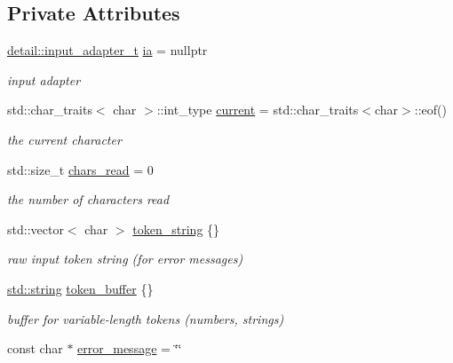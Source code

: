 \subsection*{Private Attributes}
\begin{DoxyCompactItemize}
\item 
\hyperlink{namespacenlohmann_1_1detail_ae132f8cd5bb24c5e9b40ad0eafedf1c2}{detail\+::input\+\_\+adapter\+\_\+t} \hyperlink{classnlohmann_1_1detail_1_1lexer_aa7e69cd9d51451fd798eaf501b40421f}{ia} = nullptr
\begin{DoxyCompactList}\small\item\em input adapter \end{DoxyCompactList}\item 
std\+::char\+\_\+traits$<$ char $>$\+::int\+\_\+type \hyperlink{classnlohmann_1_1detail_1_1lexer_a47169f9aaf0da4c9885e61d3109859aa}{current} = std\+::char\+\_\+traits$<$char$>$\+::eof()
\begin{DoxyCompactList}\small\item\em the current character \end{DoxyCompactList}\item 
std\+::size\+\_\+t \hyperlink{classnlohmann_1_1detail_1_1lexer_aab991bcbf230c372b276742f1790ba5b}{chars\+\_\+read} = 0
\begin{DoxyCompactList}\small\item\em the number of characters read \end{DoxyCompactList}\item 
std\+::vector$<$ char $>$ \hyperlink{classnlohmann_1_1detail_1_1lexer_ad2960e3d54af8fb8d572a8f6f7731d62}{token\+\_\+string} \{\}
\begin{DoxyCompactList}\small\item\em raw input token string (for error messages) \end{DoxyCompactList}\item 
\hyperlink{namespacenlohmann_1_1detail_a1ed8fc6239da25abcaf681d30ace4985ab45cffe084dd3d20d928bee85e7b0f21}{std\+::string} \hyperlink{classnlohmann_1_1detail_1_1lexer_aaa7a7bba826023ee34e9c99d51d55468}{token\+\_\+buffer} \{\}
\begin{DoxyCompactList}\small\item\em buffer for variable-\/length tokens (numbers, strings) \end{DoxyCompactList}\item 
const char $\ast$ \hyperlink{classnlohmann_1_1detail_1_1lexer_ae2a15e440f1889e0ab0c6a35344e48df}{error\+\_\+message} = \char`\"{}\char`\"{}

\end{DoxyCompactItemize}
